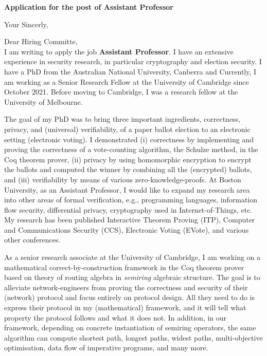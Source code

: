 \documentclass[11pt,a4paper,roman]{moderncv}
\begin{document}
\date{}
\opening{\textbf{Application for the post of Assistant Professor}}
\closing{Your Sincerly, \vspace{-1em}}



\makelettertitle



Dear Hiring Committe, 
\\
\vspace{1em}
I am writing to apply
the job \textbf{Assistant Professor}. 
I have an extensive experience in
security research, in particular cryptography and election security. 
I have a PhD from the Australian National University, Canberra
and Currently, I am working as a Senior Research Fellow at the University of 
Cambridge since October 2021. Before moving to Cambridge, I was a 
research fellow at the University of Melbourne. 

\vspace{0.5cm}
The goal of my PhD was to 
bring  three important ingredients, correctness, privacy, and (universal) verifiability, of a 
paper ballot election to an electronic setting (electronic voting). I 
demonstrated (i) correctness by implementing and proving the correctness of 
a vote-counting algorithm, the Schulze method, in the Coq theorem prover, 
(ii) privacy by using homomorphic encryption to encrypt the ballots and computed
the winner by combining all the (encrypted) ballots, and 
(iii) verifiability by means of various zero-knowledge-proofs.
At Boston University, as an Assistant Professor, 
I would like to expand my research area into other areas of formal verification, 
e.g., programming languages, information flow security, 
differential privacy,  cryptography used in Internet-of-Things,
etc. My research has been published Interactive Theorem Proving (ITP), 
Computer and Communications Security (CCS), Electronic Voting (EVote), 
and various other conferences. 

 

\vspace{0.5cm}
As a senior research associate at the University of Cambridge, 
I am working on  
a mathematical correct-by-construction framework in the Coq theorem prover 
based on theory of routing algebra in \emph{semiring} algebraic structure.
The goal is to alleviate network-engineers from proving the 
correctness and security of their (network) protocol and focus entirely on protocol design.
All  they need to do is express their protocol in my (mathematical) 
framework, and it will 
tell what property the protocol follows and what it does not. 
In addition, in our framework, depending on concrete instantiation 
of semiring operators, the same algorithm can compute shortest path, longest paths, 
widest paths, multi-objective optimisation, data flow of imperative programs, and many more. 
\end{document}
